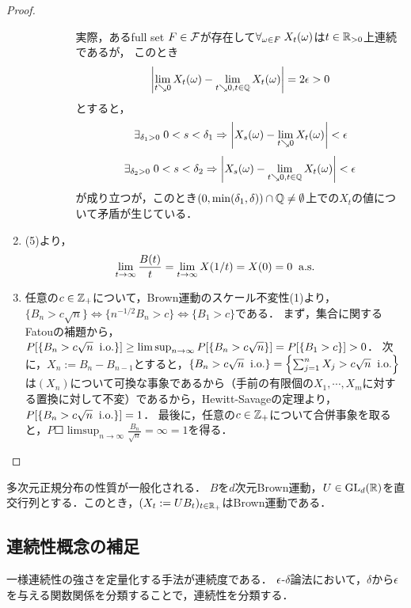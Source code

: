 \documentclass[uplatex,dvipdfmx]{jsreport}
\begin{document}
\begin{proof}
\begin{enumerate}
\begin{description}
\begin{enumerate}[(a)]
                実際，あるfull set $F\in\mathcal{F}$が存在して$\forall_{\omega\in F}\;X_t(\omega)$は$t\in\mathbb{R}_{>0}$上連続であるが，
                このとき\[\left|\lim_{t\searrow0}X_t(\omega)-\lim_{t\searrow 0,t\in\mathbb{Q}}X_t(\omega)\right|=2\epsilon>0\]とすると，
                \[\exists_{\delta_1>0}\;0<s<\delta_1\Rightarrow\left|X_s(\omega)-\lim_{t\searrow0}X_t(\omega)\right|<\epsilon\]
                \[\exists_{\delta_2>0}\;0<s<\delta_2\Rightarrow\left|X_s(\omega)-\lim_{t\searrow 0,t\in\mathbb{Q}}X_t(\omega)\right|<\epsilon\]
                が成り立つが，このとき$(0,\min(\delta_1,\delta))\cap\mathbb{Q}\ne\emptyset$上での$X_t$の値について矛盾が生じている．
            \end{enumerate}
        \end{description}
        \item (5)より，
        \[\lim_{t\to\infty}\frac{B(t)}{t}=\lim_{t\to\infty}X(1/t)=X(0)=0\;\;\mathrm{a.s.}\]
        \item 任意の$c\in\mathbb{Z}_+$について，Brown運動のスケール不変性(1)より，$\{B_n>c\sqrt{n}\}\Leftrightarrow\{n^{-1/2}B_n>c\}\Leftrightarrow\{B_1>c\}$である．
        まず，集合に関するFatouの補題から，$P[\left\{B_n>c\sqrt{n}\;\;\mathrm{i.o.}\right\}]\ge\limsup_{n\to\infty}P[\left\{B_n>c\sqrt{n}\right\}]=P[\left\{B_1>c\right\}]>0$．
        次に，$X_n:=B_n-B_{n-1}$とすると，$\left\{B_n>c\sqrt{n}\;\;\mathrm{i.o.}\right\}=\left\{\sum^n_{j=1}X_j>c\sqrt{n}\;\;\mathrm{i.o.}\right\}$は$(X_n)$について可換な事象であるから（手前の有限個の$X_1,\cdots,X_m$に対する置換に対して不変）であるから，Hewitt-Savageの定理より，$P[\left\{B_n>c\sqrt{n}\;\;\mathrm{i.o.}\right\}]=1$．
        最後に，任意の$c\in\mathbb{Z}_+$について合併事象を取ると，$P\Square{\limsup_{n\to\infty}\frac{B_n}{\sqrt{n}}=\infty}=1$を得る．
    \end{enumerate}
\end{proof}

\begin{proposition}
    多次元正規分布の性質が一般化される．
    $B$を$d$次元Brown運動，$U\in\mathrm{GL}_d(\mathbb{R})$を直交行列とする．このとき，$(X_t:=UB_t)_{t\in\mathbb{R}_+}$はBrown運動である．
\end{proposition}

\subsection{連続性概念の補足}

\begin{tcolorbox}[colframe=ForestGreen, colback=ForestGreen!10!white,breakable,colbacktitle=ForestGreen!40!white,coltitle=black,fonttitle=\bfseries\sffamily,
title=]
    一様連続性の強さを定量化する手法が連続度である．
    $\epsilon$-$\delta$論法において，$\delta$から$\epsilon$を与える関数関係を分類することで，連続性を分類する．
\end{tcolorbox}
\end{document}
